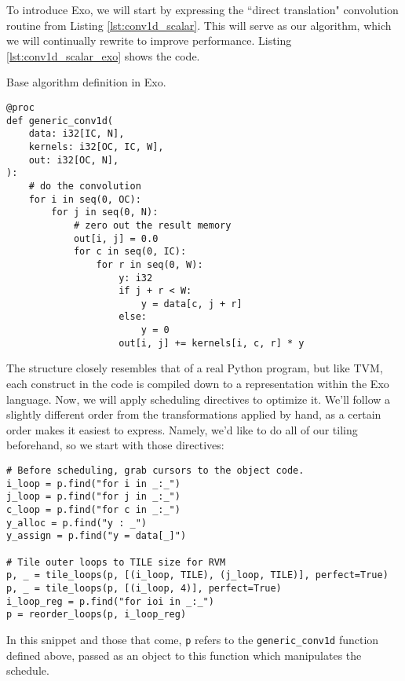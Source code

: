 \documentclass[acmsmall, nonacm=true]{acmart}
\begin{document}
To introduce Exo, we will start by expressing the ``direct translation" convolution routine from Listing \ref{lst:conv1d_scalar}. This will serve as our algorithm, which we will continually rewrite to improve performance. Listing \ref{lst:conv1d_scalar_exo} shows the code. 

\begin{listing}
\centering
\caption{Base algorithm definition in Exo.}
\begin{verbatim}
@proc
def generic_conv1d(
    data: i32[IC, N],
    kernels: i32[OC, IC, W],
    out: i32[OC, N],
):
    # do the convolution
    for i in seq(0, OC):
        for j in seq(0, N):
            # zero out the result memory
            out[i, j] = 0.0
            for c in seq(0, IC):
                for r in seq(0, W):
                    y: i32
                    if j + r < W:
                        y = data[c, j + r]
                    else:
                        y = 0
                    out[i, j] += kernels[i, c, r] * y
\end{verbatim}
\label{lst:conv1d_scalar_exo}
\end{listing}

The structure closely resembles that of a real Python program, but like TVM, each construct in the code is compiled down to a representation within the Exo language. Now, we will apply scheduling directives to optimize it. We'll follow a slightly different order from the transformations applied by hand, as a certain order makes it easiest to express. Namely, we'd like to do all of our tiling beforehand, so we start with those directives:
\begin{verbatim}
# Before scheduling, grab cursors to the object code.
i_loop = p.find("for i in _:_")
j_loop = p.find("for j in _:_")
c_loop = p.find("for c in _:_")
y_alloc = p.find("y : _")
y_assign = p.find("y = data[_]")

# Tile outer loops to TILE size for RVM
p, _ = tile_loops(p, [(i_loop, TILE), (j_loop, TILE)], perfect=True)
p, _ = tile_loops(p, [(i_loop, 4)], perfect=True)
i_loop_reg = p.find("for ioi in _:_")
p = reorder_loops(p, i_loop_reg)
\end{verbatim}

In this snippet and those that come, \verb|p| refers to the \verb|generic_conv1d| function defined above, passed as an object to this function which manipulates the schedule. 
\end{document}

